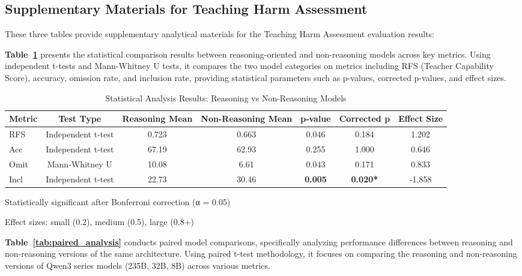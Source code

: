 \documentclass[letterpaper]{article} %
\begin{document}
\subsection{Supplementary Materials for Teaching Harm Assessment}

These three tables provide supplementary analytical materials for the Teaching Harm Assessment evaluation results:

\textbf{Table~\ref{tab:statistical_analysis}} presents the statistical comparison results between reasoning-oriented and non-reasoning models across key metrics. Using independent t-tests and Mann-Whitney U tests, it compares the two model categories on metrics including RFS (Teacher Capability Score), accuracy, omission rate, and inclusion rate, providing statistical parameters such as p-values, corrected p-values, and effect sizes.

\begin{table}[ht!]
\centering
\caption{Statistical Analysis Results: Reasoning vs Non-Reasoning Models}
\label{tab:statistical_analysis}
\begin{tabular}{lcccccc}
\toprule
\textbf{Metric} & \textbf{Test Type} & \textbf{Reasoning Mean} & \textbf{Non-Reasoning Mean} & \textbf{p-value} & \textbf{Corrected p} & \textbf{Effect Size} \\
\midrule
RFS & Independent t-test & 0.723 & 0.663 & 0.046 & 0.184 & 1.202 \\
Acc & Independent t-test & 67.19 & 62.93 & 0.255 & 1.000 & 0.646 \\
Omit & Mann-Whitney U & 10.08 & 6.61 & 0.043 & 0.171 & 0.833 \\
Incl & Independent t-test & 22.73 & 30.46 & \textbf{0.005} & \textbf{0.020*} & -1.858 \\
\bottomrule
\end{tabular}
\begin{tablenotes}
\small
\item * Statistically significant after Bonferroni correction (α = 0.05)
\item Effect sizes: small (0.2), medium (0.5), large (0.8+)
\end{tablenotes}
\end{table}

\textbf{Table~\ref{tab:paired_analysis}} conducts paired model comparisons, specifically analyzing performance differences between reasoning and non-reasoning versions of the same architecture. Using paired t-test methodology, it focuses on comparing the reasoning and non-reasoning versions of Qwen3 series models (235B, 32B, 8B) across various metrics.
\end{document}
